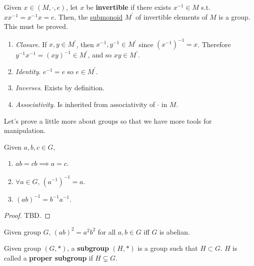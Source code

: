   \begin{example}
    \label{ex:group-of-invertible-elements-of-a-monoid}
    Given $x \in (M, \cdot, e)$, let $x$ be \textbf{invertible} if there exists $x^{-1} \in M$ s.t. $x x^{-1} = x^{-1} x = e$. Then, the \hyperref[def:submonoid]{submonoid} $M^\prime$ of invertible elements of $M$ is a group. This must be proved. 
    \begin{enumerate}
      \item \textit{Closure}. If $x, y \in M^\prime$, then $x^{-1}, y^{-1} \in M^\prime$ since $(x^{-1})^{-1} = x$. Therefore $y^{-1} x^{-1} = (xy)^{-1} \in M^\prime$, and so $xy \in M^\prime$. 
      \item \textit{Identity}. $e^{-1} = e$ so $e \in M^\prime$. 
      \item \textit{Inverses}. Exists by definition. 
      \item \textit{Associativity}. Is inherited from associativity of $\cdot$ in $M$. 
    \end{enumerate}
  \end{example}

  Let's prove a little more about groups so that we have more tools for manipulation. 

  \begin{lemma}
    \label{thm:properties-of-group-operation}
    Given $a, b, c \in G$, 
    \begin{enumerate}
      \item $ab = cb \implies a = c$. 
      \item $\forall a \in G$, $(a^{-1})^{-1} = a$. 
      \item $(ab)^{-1} = b^{-1} a^{-1}$. 
    \end{enumerate}
  \end{lemma}
  \begin{proof}
    TBD. 
  \end{proof}

  \begin{theorem}[Abelian Criterion via $(ab)^2 = a^2b^2$]
    \label{thm:abelian-criterion-via-ab2a2b2}
    Given group $G$, $(ab)^2 = a^2 b^2$ for all $a, b \in G$ iff $G$ is abelian. 
  \end{theorem}

  \begin{definition}[Subgroup]
    \label{def:subgroup}
    Given group $(G, \ast)$, a \textbf{subgroup} $(H, \ast)$ is a group such that $H \subset G$. $H$ is called a \textbf{proper subgroup} if $H \subsetneq G$. 
  \end{definition} 

